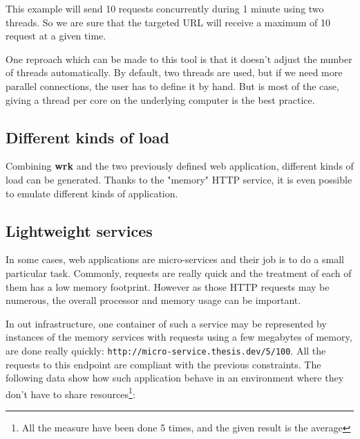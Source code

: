 This example will send 10 requests concurrently during 1 minute using two threads.
So we are sure that the targeted URL will receive a maximum of 10 request at a
given time.

One reproach which can be made to this tool is that it doesn't adjust the
number of threads automatically. By default, two threads are used, but if we
need more parallel connections, the user has to define it by hand. But is most
of the case, giving a thread per core on the underlying computer is the
best practice.

\subsection{Different kinds of load}

Combining \textbf{wrk} and the two previously defined web application, different
kinds of load can be generated. Thanks to the "memory" HTTP service, it is even
possible to emulate different kinds of application.

\subsection{Lightweight services}

In some cases, web applications are micro-services and their job is to do a small
particular task. Commonly, requests are really quick and the treatment of each of
them has a low memory footprint. However as those HTTP requests may be numerous,
the overall processor and memory usage can be important.

In out infrastructure, one container of such a service may be represented by instances
of the memory services with requests using a few megabytes of memory, are done
really quickly: \texttt{http://micro-service.thesis.dev/5/100}. All the requests to this
endpoint are compliant with the previous constraints. The following data show how 
such application behave in an environment where they don't have to share resources\footnote{All the measure
have been done 5 times, and the given result is  the average}:

